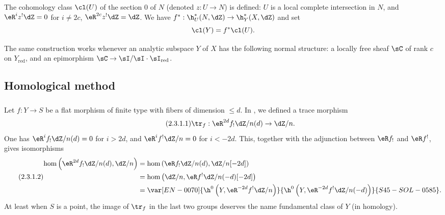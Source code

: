 The cohomology class $\cl(U)$ of the section $0$ of $N$ (denoted
$z:U\to N$) is defined: $U$ is a local complete intersection in $N$, and
$\eR^i z^!\dZ = 0$ for $i\ne 2 c$, $\eR^{2 c} z^!\dZ = \dZ$. We have
$f^*:\h_U^*(N,\dZ) \to \h_Y^*(X,\dZ)$ and set
\[
  \cl(Y) = f^*\cl(U) \text{.}
\]

The same construction works whenever an analytic subspace $Y$ of $X$ has
the following normal structure: a locally free sheaf $\sC$ of rank $c$ on
$Y_\text{red}$, and an epimorphism
$\sC\to \sI/\sI\cdot \sI_\text{red}$.










\subsection{Homological method}\label{IV:2-3}






\subsubsection{}\label{IV:2-3-1}

Let $f:Y\to S$ be a flat morphism of finite type with fibers of dimension
$\leqslant d$. In , we defined a trace morphism
\begin{equation*}\tag{2.3.1.1}\label{IV:eq:2-3-1-1}
  \tr_f:\eR^{2 d} f_! \dZ/n(d) \to \dZ/n \text{.}
\end{equation*}
One has $\eR^i f_!\dZ/n(d)=0$ for $i>2 d$, and
$\eR^i f^!\dZ/n=0$ for $i<-2 d$. This, together with the adjunction between
$\eR f_!$ and $\eR f^!$, gives isomorphisms
\begin{equation*}\tag{2.3.1.2}\label{IV:eq:2-3-1-2}
\begin{aligned}
  \hom\left(\eR^{2 d}f_!\dZ/n(d),\dZ/n\right)
    &= \hom\left(\eR f_!\dZ/n(d),\dZ/n[-2 d]\right) \\
    &= \hom\left(\dZ/n,\eR f^!\dZ/n(-d)[-2 d]\right) \\
    &= \var[EN-0070]{\h^0\left(Y,\eR^{-2 d}f^!\dZ/n\right)}{\h^0\left(Y,\eR^{-2 d}f^!\dZ/n(-d)\right)}{S45-SOL-0585} \text{.}
\end{aligned}
\end{equation*}
At least when $S$ is a point, the image of $\tr_f$ in the last two groups
deserves the name fundamental class of $Y$ (in homology).

